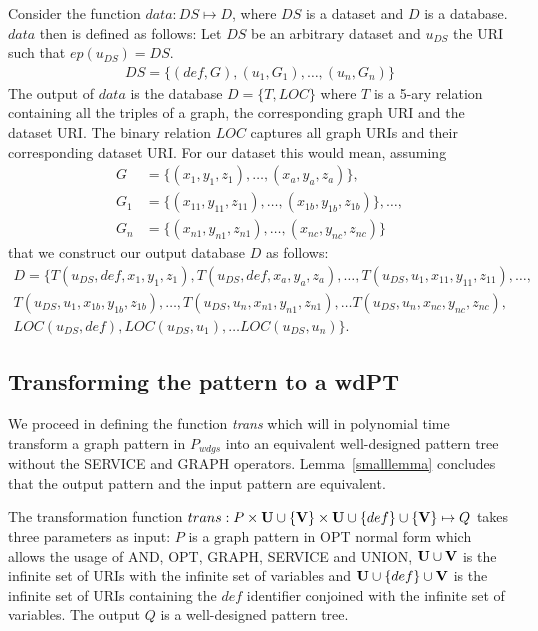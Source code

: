 Consider the function $data: DS \mapsto D$, where $DS$ is a
dataset and $D$ is a database.
$data$ then is defined as follows:
Let $DS$ be an arbitrary dataset and $u_{DS}$ the URI such that $ep(u_{DS}) = DS$.
\begin{align*}
	DS=\{(def,G),(u_1,G_1),\dots,(u_n,G_n)\}
\end{align*}
The output of $data$ is the database $D = \{ T,LOC\}$ where $T$ is a 5-ary relation containing all the triples of a graph, the corresponding graph URI and the dataset URI. The binary relation $LOC$
captures all graph URIs and their corresponding dataset URI. 
For our dataset this would mean, assuming 
\begin{align*}
	G &= \{(x_1,y_1,z_1), \dots, (x_a,y_a,z_a)\},\\ 
	G_1 &= \{(x_{11}, y_{11},z_{11}), \dots, (x_{1b},y_{1b},z_{1b}) \},\dots,\\ 
	G_n &= \{(x_{n1},y_{n1},z_{n1}),\dots,(x_{nc},y_{nc},z_{nc})\}
\end{align*} that we construct our output database $D$ as follows:
\begin{align*}
	D = \{ T(u_{DS},def,x_1,y_1,z_1), T(u_{DS},def,x_a,y_a,z_a), \dots, T(u_{DS},u_1,x_{11}, y_{11},z_{11}),
	\dots,\\ T(u_{DS},u_1,x_{1b},y_{1b},z_{1b} ), \dots,
T(u_{DS},u_n,x_{n1},y_{n1},z_{n1}), \dots T(u_{DS},u_n,x_{nc},y_{nc},z_{nc}), \\
LOC(u_{DS},def),LOC(u_{DS},u_1),\dots LOC(u_{DS},u_n) \}.
\end{align*}

\subsection{Transforming the pattern to a wdPT}
We proceed in defining the function \textit{trans} which will in polynomial time 
transform a graph pattern in $P_{wdgs}$ into an equivalent well-designed pattern tree without the
SERVICE and GRAPH operators. Lemma~\ref{smalllemma} concludes that the output pattern and the
input pattern are equivalent.

\bigskip\noindent
The transformation function $trans: P \times \mathbf{U}\cup\{\mathbf{V}\} \times \mathbf{U} \cup \{def \}\cup\{\mathbf{V}\}
\mapsto Q$ takes  three parameters as input: 
$P$ is a graph pattern in OPT normal form which allows the usage of AND, OPT, GRAPH, SERVICE and
UNION, $\mathbf{U}\cup\mathbf{V}$ is the infinite
set of URIs with the infinite set of variables and $\mathbf{U}\cup\{def\}\cup \mathbf{V}$ is the infinite set of
URIs containing the $def$ identifier conjoined with the infinite set of
variables. The output $Q$ is a well-designed pattern tree. 

